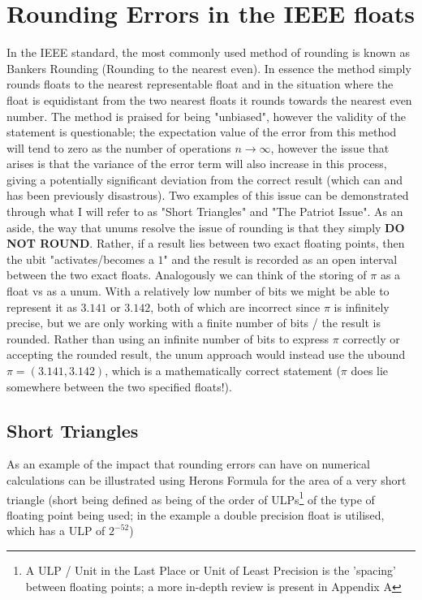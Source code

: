 \documentclass[twocolumn]{IEEEtran}
\begin{document}
\section{Rounding Errors in the IEEE floats}
In the IEEE standard, the most commonly used method of rounding is known as Bankers Rounding (Rounding to the nearest even). In essence the method simply rounds floats to the nearest representable float and in the situation where the float is equidistant from the two nearest floats it rounds towards the nearest even number. The method is praised for being "unbiased", however the validity of the statement is questionable; the expectation value of the error from this method will tend to zero as the number of operations $n \rightarrow \infty$, however the issue that arises is that the variance of the error term will also increase in this process, giving a potentially significant deviation from the correct result (which can and has been previously disastrous). Two examples of this issue can be demonstrated through what I will refer to as "Short Triangles" and "The Patriot Issue". As an aside, the way that unums resolve the issue of rounding is that they simply \textbf{DO NOT ROUND}. Rather, if a result lies between two exact floating points, then the ubit "activates/becomes a $1$" and the result is recorded as an open interval between the two exact floats. Analogously we can think of the storing of $\pi$ as a float vs as a unum. With a relatively low number of bits we might be able to represent it as $3.141$ or $3.142$, both of which are incorrect since $\pi$ is infinitely precise, but we are only working with a finite number of bits / the result is rounded. Rather than using an infinite number of bits to express $\pi$ correctly or accepting the rounded result, the unum approach would instead use the ubound $\pi  = (3.141,3.142)$, which is a mathematically correct statement ($\pi$ does lie somewhere between the two specified floats!).

\subsection{Short Triangles}
As an example of the impact that rounding errors can have on numerical calculations can be illustrated using Herons Formula for the area of a very short triangle (short being defined as being of the order of ULPs\footnote{A ULP / Unit in the Last Place or Unit of Least Precision is the 'spacing' between floating points; a more in-depth review is present in Appendix A} of the type of floating point being used; in the example a double precision float is utilised, which has a ULP of $2^{-52}$)
\end{document}
